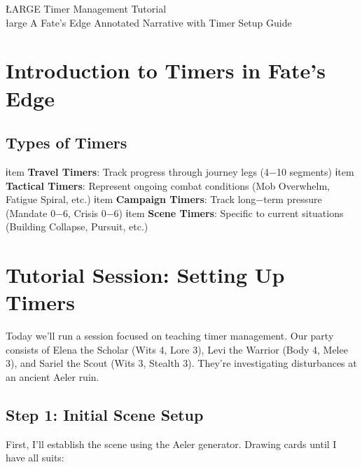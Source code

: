 \documentclass[11pt]{article}
\begin{document}
\begin{center}
{ŁARGE Timer Management Tutorial}\\
\vspace{0.5em}
{łarge A Fate's Edge Annotated Narrative with Timer Setup Guide}
\end{center}

\section*{Introduction to Timers in Fate's Edge}


\subsection*{Types of Timers}

\begin{itemize}[leftmargin=*]
ℹtem \textbf{Travel Timers}: Track progress through journey legs (4−10 segments)
ℹtem \textbf{Tactical Timers}: Represent ongoing combat conditions (Mob Overwhelm, Fatigue Spiral, etc.)
ℹtem \textbf{Campaign Timers}: Track long−term pressure (Mandate 0−6, Crisis 0−6)
ℹtem \textbf{Scene Timers}: Specific to current situations (Building Collapse, Pursuit, etc.)
\end{itemize}

\section*{Tutorial Session: Setting Up Timers}

 Today we'll run a session focused on teaching timer management. Our party consists of Elena the Scholar (Wits 4, Lore 3), Levi the Warrior (Body 4, Melee 3), and Sariel the Scout (Wits 3, Stealth 3). They're investigating disturbances at an ancient Aeler ruin.

\subsection*{Step 1: Initial Scene Setup}

 First, I'll establish the scene using the Aeler generator. Drawing cards until I have all suits:

\end{document}
